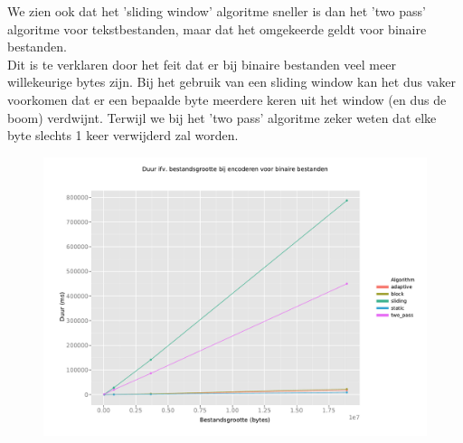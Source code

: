 \documentclass[a4paper,12pt]{report}
\begin{document}
We zien ook dat het 'sliding window' algoritme sneller is dan het 'two pass' algoritme voor tekstbestanden, maar dat het omgekeerde geldt voor binaire bestanden. \\
Dit is te verklaren door het feit dat er bij binaire bestanden veel meer willekeurige bytes zijn. Bij het gebruik van een sliding window kan het dus vaker voorkomen dat er een bepaalde byte meerdere keren uit het window (en dus de boom) verdwijnt. Terwijl we bij het 'two pass' algoritme zeker weten dat elke byte slechts 1 keer verwijderd zal worden.
\begin{figure}[H]
	\includegraphics[scale=.6]{../experimenten/grafieken/duur/encode_binaire_bestanden}
\end{figure}
\end{document}
